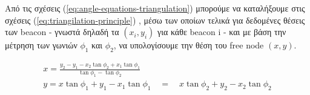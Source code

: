 Από τις σχέσεις (\ref{eq:angle-equations-triangulation}) μπορούμε να καταλήξουμε στις σχέσεις (\ref{eq:triangilation-principle}) \cite{triangulation-simple-equation}, μέσω 
των οποίων τελικά για δεδομένες θέσεις των beacon - γνωστά δηλαδή τα $(x_i,y_i)$ για κάθε beacon i - και με βάση την μέτρηση των γωνιών $\phi_1$ και $\phi_2$,
να υπολογίσουμε την θέση του free node $(x,y)$.

\begin{equation}
	\begin{gathered}
		x = \frac{y_2 - y_1-  x_2\tan \phi_2 + x_1\tan \phi_1}{\tan \phi_1 - \tan \phi_2} \\[4pt]
		y = x\tan \phi_1 + y_1 - x_1\tan \phi_1 \quad = \quad x\tan \phi_2 + y_2 - x_2\tan \phi_2    
	\end{gathered}
	\label{eq:triangilation-principle}
\end{equation}

